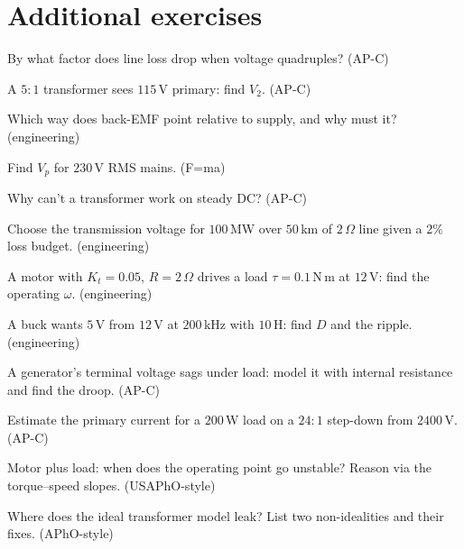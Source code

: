 \section*{Additional exercises}

\begin{exercise}[easy]
By what factor does line loss drop when voltage quadruples? (AP-C)
\end{exercise}
\begin{exercise}[easy]
A $5{:}1$ transformer sees $115$\,V primary: find $V_2$. (AP-C)
\end{exercise}
\begin{exercise}[easy]
Which way does back-EMF point relative to supply, and why must it?
(engineering)
\end{exercise}
\begin{exercise}[easy]
Find $V_p$ for $230$\,V RMS mains. (F=ma)
\end{exercise}
\begin{exercise}[easy]
Why can't a transformer work on steady DC? (AP-C)
\end{exercise}
\begin{exercise}[medium]
Choose the transmission voltage for $100$\,MW over $50$\,km of
$2\,\Omega$ line given a $2\%$ loss budget. (engineering)
\end{exercise}
\begin{exercise}[medium]
A motor with $K_t=0.05$, $R=2\,\Omega$ drives a load
$\tau=0.1$\,N\,m at $12$\,V: find the operating $\omega$. (engineering)
\end{exercise}
\begin{exercise}[medium]
A buck wants $5$\,V from $12$\,V at $200$\,kHz with $10$\,\textmu H:
find $D$ and the ripple. (engineering)
\end{exercise}
\begin{exercise}[medium]
A generator's terminal voltage sags under load: model it with internal
resistance and find the droop. (AP-C)
\end{exercise}
\begin{exercise}[medium]
Estimate the primary current for a $200$\,W load on a $24{:}1$
step-down from $2400$\,V. (AP-C)
\end{exercise}
\begin{exercise}[hard]
Motor plus load: when does the operating point go unstable? Reason via
the torque--speed slopes. (USAPhO-style)
\end{exercise}
\begin{exercise}[hard]
Where does the ideal transformer model leak? List two non-idealities
and their fixes. (APhO-style)
\end{exercise}
